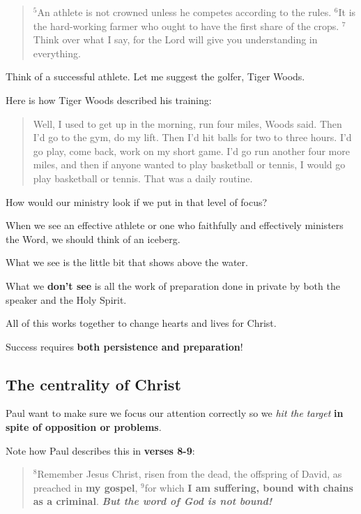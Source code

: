 \documentclass[12pt]{article} %
\newcommand{\superscript}[1]{\ensuremath{^{\textrm{#1}}}}
\begin{document}
\begin{quote}
\superscript{5}An athlete is not crowned unless he competes according to the rules.
\superscript{6}It is the hard-working farmer who ought to have the first share of the crops.
\superscript{7}Think over what I say, for the Lord will give you understanding in everything.
\end{quote}

Think of a successful athlete. Let me suggest the golfer, Tiger Woods.

Here is how Tiger Woods described his training:

\begin{quote}
Well, I used to get up in the morning, run four miles, Woods said.
Then I’d go to the gym, do my lift. Then I’d hit balls for two to three hours.
I’d go play, come back, work on my short game. I’d go run another four more
miles, and then if anyone wanted to play basketball or tennis, I would go play
basketball or tennis. That was a daily routine.
\end{quote}

How would our ministry look if we put in that level of focus?

When we see an effective athlete or one who faithfully and effectively
ministers the Word, we should think of an iceberg.

What we see is the little bit that shows above the water.

What we \textbf{don't see} is all the work of preparation done in private
by both the speaker and the Holy Spirit. 

All of this works together to change hearts and lives for Christ. 

Success requires \textbf{both persistence and preparation}!

\subsection{The centrality of Christ}

Paul want to make sure we focus our attention correctly so we
\emph{hit the target} \textbf{in spite of opposition or problems}.

Note how Paul describes this in \textbf{verses 8-9}:

\begin{quote}
\superscript{8}Remember Jesus Christ, risen from the dead, the offspring
of David, as preached in \textbf{my gospel},
\superscript{9}for which \textbf{I am suffering, bound with chains as a criminal}.
\textbf{\emph{But the word of God is not bound!}}
\end{quote}
\end{document}
